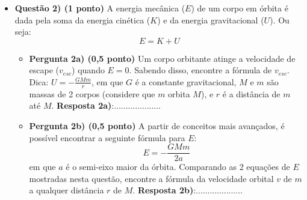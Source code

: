 \documentclass[a4paper, 12pt]{article}
\begin{document}
\begin{flushleft}
\begin{itemize}
		\item \textbf{Questão 2) (1 ponto)} A energia mecânica ($E$) de um corpo em órbita é dada pela soma da energia cinética ($K$) e da energia gravitacional ($U$). Ou seja:
			$$E=K+U$$
			\begin{itemize}
				\item \textbf{Pergunta 2a) (0,5 ponto)} Um corpo orbitante atinge a velocidade de escape ($v_{esc}$) quando $E=0$. Sabendo disso, encontre a fórmula de $v_{esc}$. \linebreak
					Dica: $U = - \frac{GMm}{r}$, em que $G$ é a constante gravitacional, $M$ e $m$ são massas de 2 corpos (considere que $m$ orbita $M$), e $r$ é a distância de $m$ até $M$.
					\linebreak \linebreak \linebreak \linebreak \linebreak \linebreak \linebreak \linebreak \linebreak \linebreak
					\textbf{Resposta 2a)}:....................
				\item \textbf{Pergunta 2b) (0,5 ponto)} A partir de conceitos mais avançados, é possível encontrar a seguinte fórmula para $E$:
					$$E = -\frac{GMm}{2a}$$
					em que $a$ é o semi-eixo maior da órbita. Comparando as 2 equações de $E$ mostradas nesta questão, encontre a fórmula da velocidade orbital $v$ de $m$ a qualquer distância $r$ de $M$.
					\linebreak \linebreak \linebreak \linebreak \linebreak \linebreak \linebreak \linebreak \linebreak \linebreak
					\textbf{Resposta 2b)}:....................
			\end{itemize}
			

\end{itemize}
\end{flushleft}
\end{document}
